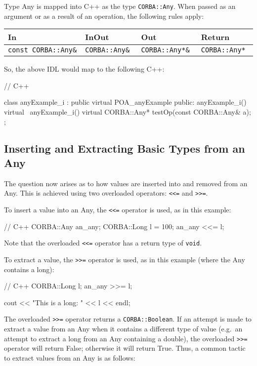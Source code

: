 \documentclass[11pt,twoside,a4paper]{book}
\newcommand{\type}[1]{\texttt{#1}}
\newcommand{\code}[1]{\texttt{#1}}
\begin{document}
Type Any is mapped into C++ as the type \type{CORBA::Any}. When passed
as an argument or as a result of an operation, the following rules
apply:

\mbox{}

{\small
\begin{tabular}{llll}
{\bf In }                & {\bf InOut }       & {\bf Out }           & 
{\bf Return }                                                   \\ \hline
{\tt const CORBA::Any\& }& {\tt CORBA::Any\& }& {\tt CORBA::Any*\& } & 
{\tt CORBA::Any* }
\end{tabular}
}

\mbox{}

\noindent So, the above IDL would map to the following C++:

\begin{cxxlisting}
// C++

class anyExample_i : public virtual POA_anyExample {
public:
  anyExample_i() { }
  virtual ~anyExample_i() { }
  virtual CORBA::Any* testOp(const CORBA::Any& a);
};
\end{cxxlisting}


\subsection{Inserting and Extracting Basic Types from an Any}

The question now arises as to how values are inserted into and removed
from an Any. This is achieved using two overloaded operators:
\code{<{}<=} and \code{>{}>=}.

To insert a value into an Any, the \code{<{}<=} operator is used, as
in this example:

\begin{cxxlisting}
// C++
CORBA::Any an_any;
CORBA::Long l = 100;
an_any <<= l;
\end{cxxlisting}

\noindent Note that the overloaded \code{<{}<=} operator has a return
type of \type{void}.

To extract a value, the \code{>{}>=} operator is used, as in this
example (where the Any contains a long):

\begin{cxxlisting}
// C++
CORBA::Long l;
an_any >>= l;

cout << "This is a long: " << l << endl;
\end{cxxlisting}


The overloaded \code{>{}>=} operator returns a \type{CORBA::Boolean}.
If an attempt is made to extract a value from an Any when it contains
a different type of value (e.g.\ an attempt to extract a long from an
Any containing a double), the overloaded \code{>{}>=} operator will
return False; otherwise it will return True. Thus, a common tactic to
extract values from an Any is as follows:
\end{document}
